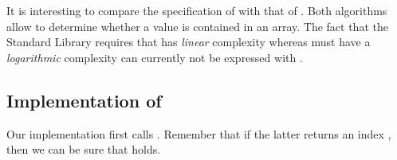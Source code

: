 

It is interesting to compare the specification of 
with that of .
Both algorithms allow to determine whether a value is contained in an array.
The fact that the \cxx Standard Library requires that \find has
\emph{linear} complexity whereas \binarysearch must have a
\emph{logarithmic} complexity can currently not be expressed with \acsl.


\subsection{Implementation of \binarysearch}

Our implementation  first calls .
Remember that if the latter returns an index ,
then we can be sure that  holds.



